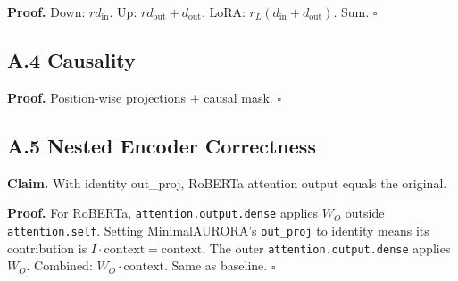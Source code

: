\textbf{Proof.} Down: $r d_\text{in}$. Up: $r d_\text{out} + d_\text{out}$. LoRA: $r_L(d_\text{in} + d_\text{out})$. Sum. $\square$

\subsection{A.4 Causality}

\textbf{Proof.} Position-wise projections + causal mask. $\square$

\subsection{A.5 Nested Encoder Correctness}

\textbf{Claim.} With identity out\_proj, RoBERTa attention output equals the 
original.

\textbf{Proof.} For RoBERTa, \texttt{attention.output.dense} applies $W_O$ outside 
\texttt{attention.self}. Setting MinimalAURORA's \texttt{out\_proj} to identity means 
its contribution is $I \cdot \text{context} = \text{context}$. The outer 
\texttt{attention.output.dense} applies $W_O$. Combined: $W_O \cdot \text{context}$. 
Same as baseline. $\square$

